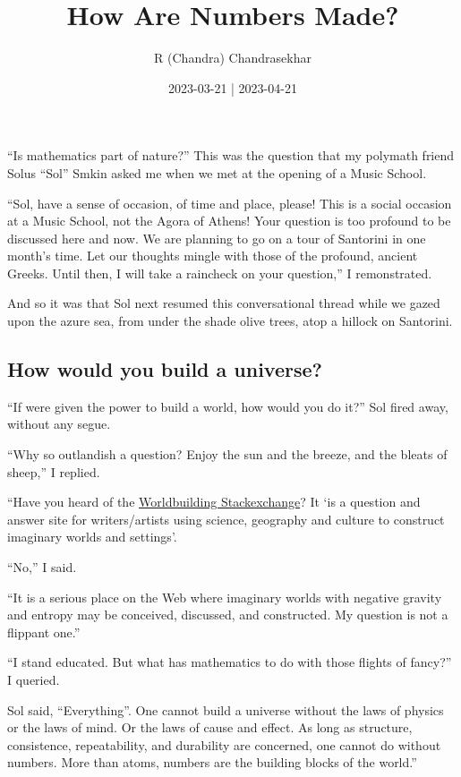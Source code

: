 \documentclass[
  a4paper,
]{article}
\title{How Are Numbers Made?}
\author{R (Chandra) Chandrasekhar}
\date{2023-03-21 | 2023-04-21}
\begin{document}
\maketitle

\thispagestyle{empty}


``Is mathematics part of nature?'' This was the question that my
polymath friend Solus ``Sol'' Smkin asked me when we met at the opening
of a Music School.

``Sol, have a sense of occasion, of time and place, please! This is a
social occasion at a Music School, not the Agora of Athens! Your
question is too profound to be discussed here and now. We are planning
to go on a tour of Santorini in one month's time. Let our thoughts
mingle with those of the profound, ancient Greeks. Until then, I will
take a raincheck on your question,'' I remonstrated.

And so it was that Sol next resumed this conversational thread while we
gazed upon the azure sea, from under the shade olive trees, atop a
hillock on Santorini.

\subsection{How would you build a
universe?}\label{how-would-you-build-a-universe}

``If were given the power to build a world, how would you do it?'' Sol
fired away, without any segue.

``Why so outlandish a question? Enjoy the sun and the breeze, and the
bleats of sheep,'' I replied.

``Have you heard of the
\href{https://worldbuilding.stackexchange.com/}{Worldbuilding
Stackexchange}? It `is a question and answer site for writers/artists
using science, geography and culture to construct imaginary worlds and
settings'.

``No,'' I said.

``It is a serious place on the Web where imaginary worlds with negative
gravity and entropy may be conceived, discussed, and constructed. My
question is not a flippant one.''

``I stand educated. But what has mathematics to do with those flights of
fancy?'' I queried.

Sol said, ``Everything''. One cannot build a universe without the laws
of physics or the laws of mind. Or the laws of cause and effect. As long
as structure, consistence, repeatability, and durability are concerned,
one cannot do without numbers. More than atoms, numbers are the building
blocks of the world.''
\end{document}
